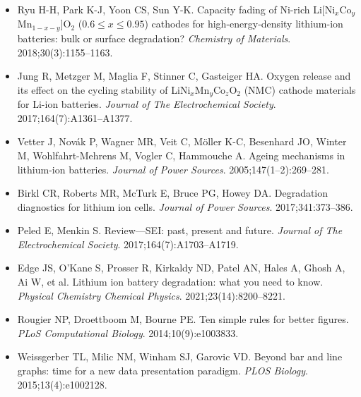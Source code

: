 {\sloppy
\begin{itemize}
\item Ryu H-H, Park K-J, Yoon CS, Sun Y-K. Capacity fading of Ni-rich Li[Ni$_x$Co$_y$Mn$_{1-x-y}$]O$_2$ ($0.6 \le x \le 0.95$) cathodes for high-energy-density lithium-ion batteries: bulk or surface degradation? \emph{Chemistry of Materials}. 2018;30(3):1155--1163. 
\item Jung R, Metzger M, Maglia F, Stinner C, Gasteiger HA. Oxygen release and its effect on the cycling stability of LiNi$_x$Mn$_y$Co$_z$O$_2$ (NMC) cathode materials for Li-ion batteries. \emph{Journal of The Electrochemical Society}. 2017;164(7):A1361--A1377. 
\item Vetter J, Nov\'ak P, Wagner MR, Veit C, M\"oller K-C, Besenhard JO, Winter M, Wohlfahrt-Mehrens M, Vogler C, Hammouche A. Ageing mechanisms in lithium-ion batteries. \emph{Journal of Power Sources}. 2005;147(1--2):269--281. 
\item Birkl CR, Roberts MR, McTurk E, Bruce PG, Howey DA. Degradation diagnostics for lithium ion cells. \emph{Journal of Power Sources}. 2017;341:373--386. 
\item Peled E, Menkin S. Review---SEI: past, present and future. \emph{Journal of The Electrochemical Society}. 2017;164(7):A1703--A1719. 
\item Edge JS, O'Kane S, Prosser R, Kirkaldy ND, Patel AN, Hales A, Ghosh A, Ai W, et al. Lithium ion battery degradation: what you need to know. \emph{Physical Chemistry Chemical Physics}. 2021;23(14):8200--8221. 
\item Rougier NP, Droettboom M, Bourne PE. Ten simple rules for better figures. \emph{PLoS Computational Biology}. 2014;10(9):e1003833. 
\item Weissgerber TL, Milic NM, Winham SJ, Garovic VD. Beyond bar and line graphs: time for a new data presentation paradigm. \emph{PLOS Biology}. 2015;13(4):e1002128. 
\end{itemize}
\par}
